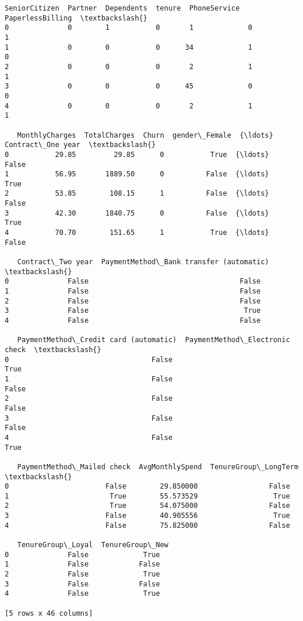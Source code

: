 \documentclass[11pt]{article}
\begin{document}
    \begin{Verbatim}[commandchars=\\\{\}]
   SeniorCitizen  Partner  Dependents  tenure  PhoneService  PaperlessBilling  \textbackslash{}
0              0        1           0       1             0                 1
1              0        0           0      34             1                 0
2              0        0           0       2             1                 1
3              0        0           0      45             0                 0
4              0        0           0       2             1                 1

   MonthlyCharges  TotalCharges  Churn  gender\_Female  {\ldots}  Contract\_One year  \textbackslash{}
0           29.85         29.85      0           True  {\ldots}              False
1           56.95       1889.50      0          False  {\ldots}               True
2           53.85        108.15      1          False  {\ldots}              False
3           42.30       1840.75      0          False  {\ldots}               True
4           70.70        151.65      1           True  {\ldots}              False

   Contract\_Two year  PaymentMethod\_Bank transfer (automatic)  \textbackslash{}
0              False                                    False
1              False                                    False
2              False                                    False
3              False                                     True
4              False                                    False

   PaymentMethod\_Credit card (automatic)  PaymentMethod\_Electronic check  \textbackslash{}
0                                  False                            True
1                                  False                           False
2                                  False                           False
3                                  False                           False
4                                  False                            True

   PaymentMethod\_Mailed check  AvgMonthlySpend  TenureGroup\_LongTerm  \textbackslash{}
0                       False        29.850000                 False
1                        True        55.573529                  True
2                        True        54.075000                 False
3                       False        40.905556                  True
4                       False        75.825000                 False

   TenureGroup\_Loyal  TenureGroup\_New
0              False             True
1              False            False
2              False             True
3              False            False
4              False             True

[5 rows x 46 columns]
    \end{Verbatim}
\end{document}
